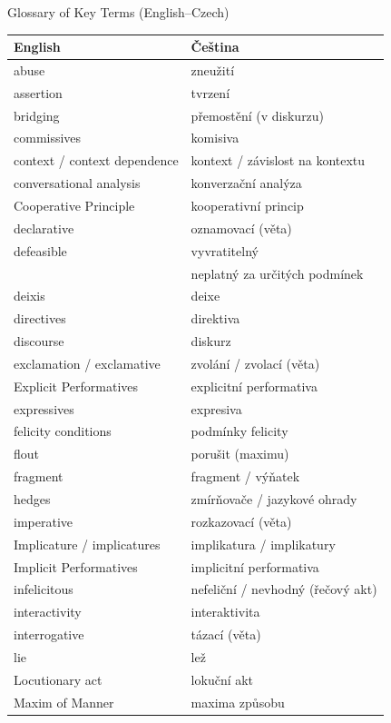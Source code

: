 \documentclass{beamer}
\begin{document}
\begin{frame}[allowframebreaks]{Glossary of Key Terms (English--Czech)}
\begin{longtable}{ll}
  English & Čeština \\\hline \endhead
abuse & zneužití \\
assertion & tvrzení \\
bridging & přemostění (v diskurzu) \\
commissives & komisiva \\
context / context dependence & kontext / závislost na kontextu \\
conversational analysis & konverzační analýza \\
Cooperative Principle & kooperativní princip \\
declarative & oznamovací (věta) \\
defeasible & vyvratitelný \\
           &  neplatný za určitých podmínek \\
deixis & deixe \\
directives & direktiva \\
discourse & diskurz \\
exclamation / exclamative & zvolání / zvolací (věta) \\
Explicit Performatives & explicitní performativa \\
expressives & expresiva \\
felicity conditions & podmínky felicity \\
flout & porušit (maximu) \\
fragment & fragment / výňatek \\
hedges & zmírňovače / jazykové ohrady \\
imperative & rozkazovací (věta) \\
Implicature / implicatures & implikatura / implikatury \\
Implicit Performatives & implicitní performativa \\
infelicitous & nefeliční / nevhodný (řečový akt) \\
interactivity & interaktivita \\
interrogative & tázací (věta) \\
lie & lež \\
Locutionary act & lokuční akt \\
Maxim of Manner & maxima způsobu \\

\end{longtable}
\end{frame}
\end{document}

